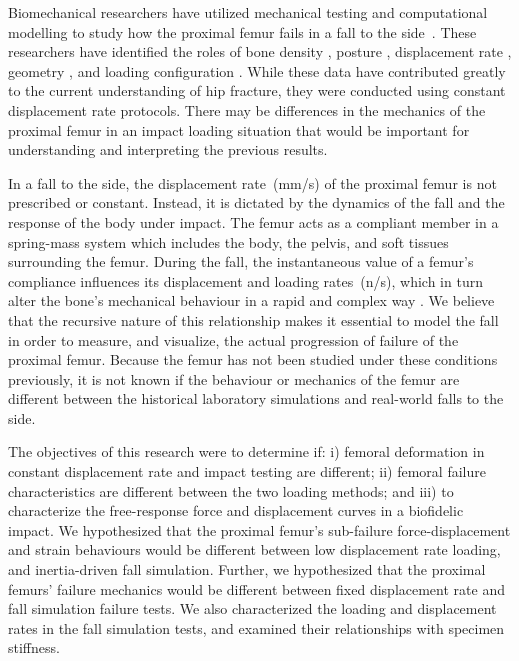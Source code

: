 Biomechanical researchers have utilized mechanical testing and computational modelling to study how the proximal femur fails in a fall to the side~\citep{keyak_prediction_1998, keyak_prediction_2000, verhulp_comparison_2006, verhulp_load_2008, srinivasan_relationship_2011, koivumaki_ct-based_2012}.
These researchers have identified the roles of bone density \citep{lotz_use_1990, courtney_age-related_1995, leichter_optical_2001, lochmuller_mechanical_2002, eckstein_reproducibility_2004, boehm_prediction_2008, manske_cortical_2008, de_bakker_during_2009, pulkkinen_experimental_2008}, posture \citep{pinilla_impact_1996}, displacement rate \citep{ weber_proximal_1992, courtney_effects_1994}, geometry \citep{cheng_assessment_1997}, and loading configuration \citep{keyak_prediction_1998, keyak_relationships_2000}.
While these data have contributed greatly to the current understanding of hip fracture, they were conducted using constant displacement rate protocols.
There may be differences in the mechanics of the proximal femur in an impact loading situation that would be important for understanding and interpreting the previous results.

In a fall to the side, the displacement rate~(\ac{mm}/\ac{s}) of the proximal femur is not prescribed or constant.
Instead, it is dictated by the dynamics of the fall and the response of the body under impact.
The femur acts as a compliant member in a spring-mass system which includes the body, the pelvis, and soft tissues surrounding the femur.
During the fall, the instantaneous value of a femur's compliance influences its displacement and loading rates~(\ac{n}/\ac{s}), which in turn alter the bone's mechanical behaviour in a rapid and complex way \citep{carter_compressive_1977, linde_mechanical_1991}.
We believe that the recursive nature of this relationship makes it essential to model the fall in order to measure, and visualize, the actual progression of failure of the proximal femur.
Because the femur has not been studied under these conditions previously, it is not known if the behaviour or mechanics of the femur are different between the historical laboratory simulations and real-world falls to the side.

The objectives of this research were to determine if: i) femoral deformation in constant displacement rate and impact testing are different; ii) femoral failure characteristics are different between the two loading methods; and iii) to characterize the free-response force and displacement curves in a biofidelic impact.
We hypothesized that the proximal femur's sub-failure force-displacement and strain behaviours would be different between low displacement rate loading, and inertia-driven fall simulation.
Further, we hypothesized that the proximal femurs' failure mechanics would be different between fixed displacement rate and fall simulation failure tests. 
We also characterized the loading and displacement rates in the fall simulation tests, and examined their relationships with specimen stiffness.

